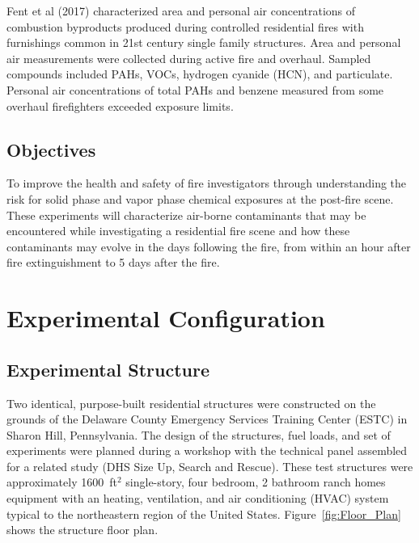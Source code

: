 \documentclass[12pt,oneside]{book}
\begin{document}
Fent et al (2017) characterized area and personal air concentrations of combustion byproducts produced during controlled residential fires with furnishings common in 21st century single family structures. Area and personal air measurements were collected during active fire and overhaul. Sampled compounds included PAHs, VOCs, hydrogen cyanide (HCN), and particulate. Personal air concentrations of total PAHs and benzene measured from some overhaul firefighters exceeded exposure limits.

\section{Objectives}

To improve the health and safety of fire investigators through understanding the risk for solid phase and vapor phase chemical exposures at the post-fire scene.  These experiments will characterize air-borne contaminants that may be encountered while investigating a residential fire scene and how these contaminants may evolve in the days following the fire, from within an hour after fire extinguishment to 5 days after the fire.          


\chapter{Experimental Configuration}
\label{chap:exp_config}

\section{Experimental Structure}

Two identical, purpose-built residential structures were constructed on the grounds of the Delaware County Emergency Services Training Center (ESTC) in Sharon Hill, Pennsylvania. The design of the structures, fuel loads, and set of experiments were planned during a workshop with the technical panel assembled for a related study (DHS Size Up, Search and Rescue).  These test structures were approximately 1600~ft$^2$ single-story, four bedroom, 2 bathroom ranch homes equipment with an heating, ventilation, and air conditioning (HVAC) system typical to the northeastern region of the United States. Figure~\ref{fig:Floor_Plan} shows the structure floor plan.
\end{document}

